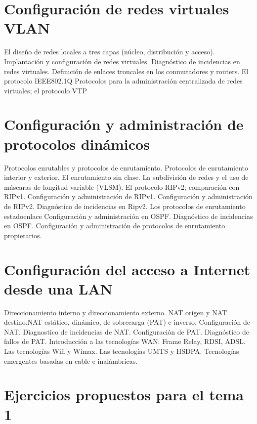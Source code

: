 \documentclass[letterpaper,10pt,spanish]{sphinxmanual}
\begin{document}
\chapter{Configuración de redes virtuales VLAN}
\label{\detokenize{t5_vlans/apuntes_t5:configuracion-de-redes-virtuales-vlan}}\label{\detokenize{t5_vlans/apuntes_t5::doc}}
El diseño de redes locales a tres capas (núcleo, distribución y acceso).
Implantación y configuración de redes virtuales.
Diagnóstico de incidencias en redes virtuales.
Definición de enlaces troncales en los conmutadores y routers.
El protocolo IEEE802.1Q
Protocolos para la administración centralizada de redes virtuales; el protocolo VTP


\chapter{Configuración y administración de protocolos dinámicos}
\label{\detokenize{t6_enrutamiento_dinamico/apuntes_t6:configuracion-y-administracion-de-protocolos-dinamicos}}\label{\detokenize{t6_enrutamiento_dinamico/apuntes_t6::doc}}
Protocolos enrutables y protocolos de enrutamiento.
Protocolos de enrutamiento interior y exterior.
El enrutamiento sin clase.
La subdivisión de redes y el uso de máscaras de longitud variable (VLSM).
El protocolo RIPv2; comparación con RIPv1.
Configuración y administración de RIPv1.
Configuración y administración de RIPv2.
Diagnóstico de incidencias en Ripv2.
Los protocolos de enrutamiento estado\sphinxhyphen{}enlace
Configuración y administración en OSPF.
Diagnóstico de incidencias en OSPF.
Configuración y administración de protocolos de enrutamiento propietarios.


\chapter{Configuración del acceso a Internet desde una LAN}
\label{\detokenize{t7_acceso_internet/apuntes_t7:configuracion-del-acceso-a-internet-desde-una-lan}}\label{\detokenize{t7_acceso_internet/apuntes_t7::doc}}
Direccionamiento interno y direccionamiento externo.
NAT origen y NAT destino.NAT estático, dinámico, de sobrecarga (PAT) e inverso.
Configuración de NAT.
Diagnostico de incidencias de NAT.
Configuración de PAT.
Diagnóstico de fallos de PAT.
Introducción a las tecnologías WAN: Frame Relay, RDSI, ADSL.
Las tecnologías Wifi y Wimax.
Las tecnologías UMTS y HSDPA.
Tecnologías emergentes basadas en cable e inalámbricas.


\chapter{Ejercicios propuestos para el tema 1}
\label{\detokenize{anexos/t1_ejercicios:ejercicios-propuestos-para-el-tema-1}}\label{\detokenize{anexos/t1_ejercicios::doc}}
\end{document}
